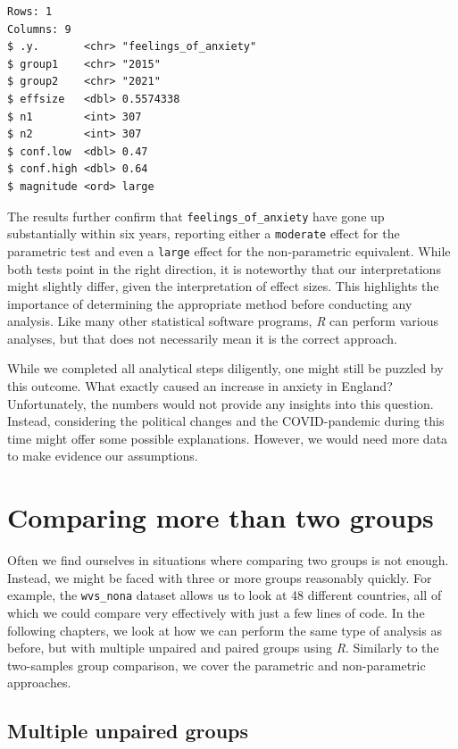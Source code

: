 \documentclass[
  letterpaper,
  DIV=11,
  numbers=noendperiod]{scrreprt}
\begin{document}
\begin{verbatim}
Rows: 1
Columns: 9
$ .y.       <chr> "feelings_of_anxiety"
$ group1    <chr> "2015"
$ group2    <chr> "2021"
$ effsize   <dbl> 0.5574338
$ n1        <int> 307
$ n2        <int> 307
$ conf.low  <dbl> 0.47
$ conf.high <dbl> 0.64
$ magnitude <ord> large
\end{verbatim}

The results further confirm that \texttt{feelings\_of\_anxiety} have
gone up substantially within six years, reporting either a
\texttt{moderate} effect for the parametric test and even a
\texttt{large} effect for the non-parametric equivalent. While both
tests point in the right direction, it is noteworthy that our
interpretations might slightly differ, given the interpretation of
effect sizes. This highlights the importance of determining the
appropriate method before conducting any analysis. Like many other
statistical software programs, \emph{R} can perform various analyses,
but that does not necessarily mean it is the correct approach.

While we completed all analytical steps diligently, one might still be
puzzled by this outcome. What exactly caused an increase in anxiety in
England? Unfortunately, the numbers would not provide any insights into
this question. Instead, considering the political changes and the
COVID-pandemic during this time might offer some possible explanations.
However, we would need more data to make evidence our assumptions.

\section{Comparing more than two
groups}\label{sec-comparing-more-than-two-groups}

Often we find ourselves in situations where comparing two groups is not
enough. Instead, we might be faced with three or more groups reasonably
quickly. For example, the \texttt{wvs\_nona} dataset allows us to look
at 48 different countries, all of which we could compare very
effectively with just a few lines of code. In the following chapters, we
look at how we can perform the same type of analysis as before, but with
multiple unpaired and paired groups using \emph{R}. Similarly to the
two-samples group comparison, we cover the parametric and non-parametric
approaches.

\subsection{Multiple unpaired
groups}\label{sec-multiple-unpaired-groups}
\end{document}

